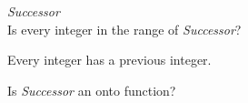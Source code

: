 \documentclass{ximera}
\begin{document}
\begin{question} \textit{Successor} \\
Is every integer in the range of \textit{Successor}?


\begin{multipleChoice}
\end{multipleChoice}
\begin{feedback}
Every integer has a previous integer.  
\end{feedback}


Is \textit{Successor} an onto function?
\begin{multipleChoice}
\end{multipleChoice}


\end{question} 
\end{document}
